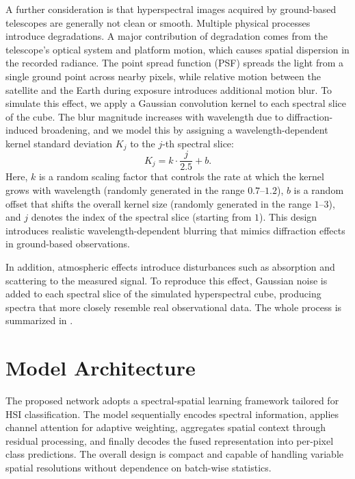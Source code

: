\documentclass[12pt]{elsarticle}
\begin{document}
A further consideration is that hyperspectral images acquired by ground-based telescopes are generally not clean or smooth. Multiple physical processes introduce degradations. A major contribution of degradation comes from the telescope’s optical system and platform motion, which causes spatial dispersion in the recorded radiance. The point spread function (PSF) spreads the light from a single ground point across nearby pixels, while relative motion between the satellite and the Earth during exposure introduces additional motion blur. To simulate this effect, we apply a Gaussian convolution kernel to each spectral slice of the cube. The blur magnitude increases with wavelength due to diffraction-induced broadening, and we model this by assigning a wavelength-dependent kernel standard deviation \(K_j\) to the \(j\)-th spectral slice:
\begin{equation}
K_j = k \cdot \frac{j}{2.5} + b .
\end{equation}
Here, \(k\) is a random scaling factor that controls the rate at which the 
kernel grows with wavelength (randomly generated in the range \(0.7\)–\(1.2\)), \(b\) is a random offset that shifts the overall kernel size (randomly generated in the range \(1\)–\(3\)), and \(j\) denotes the index of the spectral slice (starting from \(1\)). This design introduces realistic wavelength-dependent blurring that mimics diffraction effects in ground-based observations.

In addition, atmospheric effects introduce disturbances such as absorption and scattering to the measured signal. To reproduce this effect, Gaussian noise is added to each spectral slice of the simulated hyperspectral cube, producing spectra that more closely resemble real observational data. The whole process is summarized in .



\section{Model Architecture}



The proposed network adopts a spectral-spatial learning framework tailored for HSI classification. 
The model sequentially encodes spectral information, applies channel attention for adaptive weighting, aggregates spatial context through residual processing, and finally decodes the fused representation into per-pixel class predictions. 
The overall design is compact and capable of handling variable spatial resolutions without dependence on batch-wise statistics.
\end{document}
